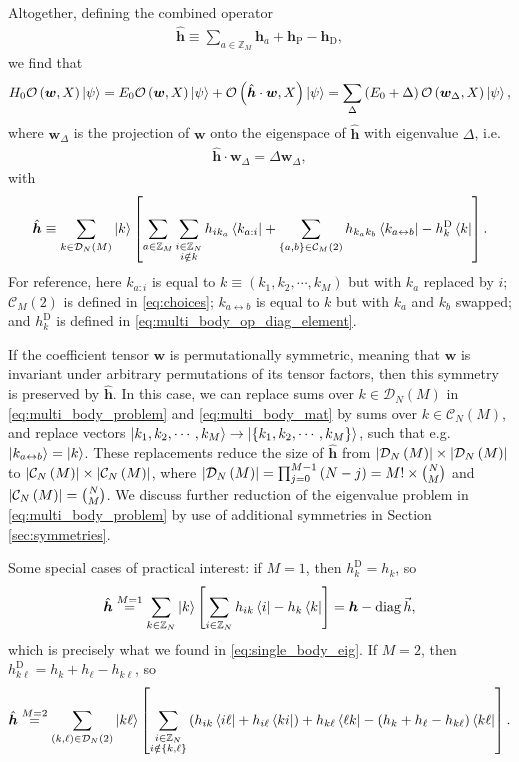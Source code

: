 \documentclass[nofootinbib,notitlepage,11pt]{revtex4-2}
\renewcommand{\t}{\text} %
\newcommand{\p}[1]{\left(#1\right)} %
\renewcommand{\sp}[1]{\left[#1\right]} %
\renewcommand{\set}[1]{\left\{#1\right\}} %
\renewcommand{\c}{\cdot} %
\newcommand{\m}{\bm} %
\renewcommand{\v}{\vec} %
\newcommand{\1}{\mathds{1}}
\renewcommand{\i}{\mathrm{i}\mkern1mu}
\newcommand{\C}{\mathcal{C}}
\newcommand{\D}{\mathcal{D}}
\renewcommand{\O}{\mathcal{O}}
\newcommand{\ZZ}{\mathbb{Z}}
\newcommand{\oper}{\operatorname}
\newcommand{\lra}{\leftrightarrow}
\begin{document}
Altogether, defining the combined operator
\begin{align}
  \hat{\m h}
  \equiv \sum_{a\in\ZZ_M} \m h_a + \m h_{\t{P}} - \m h_{\t{D}},
\end{align}
we find that
\begin{align}
  H_0 \O\p{\m w,X} \ket\psi
  = E_0 \O\p{\m w,X} \ket\psi +
  \O\p{\hat{\m h}\c\m w, X} \ket\psi
  = \sum_\Delta \p{E_0+\Delta} \O\p{\m w_\Delta, X} \ket\psi,
\end{align}
where $\m w_\Delta$ is the projection of $\m w$ onto the eigenspace of
$\hat{\m h}$ with eigenvalue $\Delta$, i.e.
\begin{align}
  \hat{\m h} \c \m w_\Delta = \Delta \m w_\Delta,
  \label{eq:multi_body_problem}
\end{align}
with
\begin{align}
  \hat{\m h} \equiv \sum_{k\in\D_N\p{M}} \ket{k}
  \sp{\sum_{a\in\ZZ_M} \sum_{\substack{i\in\ZZ_N\\i\notin k}}
    h_{ik_a} \bra{k_{a:i}}
    + \sum_{\set{a,b}\in\C_M\p{2}} h_{k_ak_b} \bra{k_{a\lra b}}
    - h^{\t{D}}_k \bra{k}}.
  \label{eq:multi_body_mat}
\end{align}
For reference, here $k_{a:i}$ is equal to
$k\equiv\p{k_1,k_2,\cdots,k_M}$ but with $k_a$ replaced by $i$;
$\C_M\p{2}$ is defined in \eqref{eq:choices}; $k_{a\lra b}$ is equal
to $k$ but with $k_a$ and $k_b$ swapped; and $h^{\t{D}}_k$ is defined
in \eqref{eq:multi_body_op_diag_element}.

If the coefficient tensor $\m w$ is permutationally symmetric, meaning
that $\m w$ is invariant under arbitrary permutations of its tensor
factors, then this symmetry is preserved by $\hat{\m h}$.  In this
case, we can replace sums over $k\in\D_N\p{M}$ in
\eqref{eq:multi_body_problem} and \eqref{eq:multi_body_mat} by sums
over $k\in\C_N\p{M}$, and replace vectors
$\ket{k_1,k_2,\cdots,k_M}\to\ket{\set{k_1,k_2,\cdots,k_M}}$, such that
e.g.~$\ket{k_{a\lra b}}=\ket{k}$.  These replacements reduce the size
of $\hat{\m h}$ from $\abs{\D_N\p{M}}\times\abs{\D_N\p{M}}$ to
$\abs{\C_N\p{M}}\times\abs{\C_N\p{M}}$, where
$\abs{\D_N\p{M}}=\prod_{j=0}^{M-1}\p{N-j}=M!\times{N\choose M}$ and
$\abs{\C_N\p{M}}={N\choose M}$.  We discuss further reduction of the
eigenvalue problem in \eqref{eq:multi_body_problem} by use of
additional symmetries in Section \ref{sec:symmetries}.

Some special cases of practical interest: if $M=1$, then
$h^{\t{D}}_k=h_k$, so
\begin{align}
  \hat{\m h} \stackrel{M=1}{=} \sum_{k\in\ZZ_N} \ket{k}
  \sp{\sum_{i\in\ZZ_N} h_{ik} \bra{i} - h_k \bra{k}}
  = \m h - \oper{diag}\v h,
\end{align}
which is precisely what we found in \eqref{eq:single_body_eig}.  If
$M=2$, then $h_{k\ell}^{\t{D}}=h_k+h_\ell-h_{k\ell}$, so
\begin{align}
  \hat{\m h} \stackrel{M=2}{=}
  \sum_{\p{k,\ell}\in\D_N\p{2}} \ket{k\ell}
  \sp{\sum_{\substack{i\in\ZZ_N\\i\notin\set{k,\ell}}}
    \p{ h_{ik} \bra{i\ell} + h_{i\ell} \bra{ki} }
    + h_{k\ell} \bra{\ell k}
    - \p{h_k + h_\ell - h_{k\ell}} \bra{k\ell}}.
\end{align}
\end{document}
